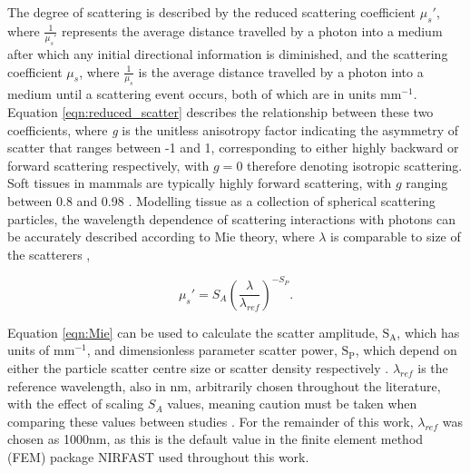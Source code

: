 \documentclass[twoside]{bhamthesis}
\theoremstyle{definition}
\begin{document}
The degree of scattering is described by the reduced scattering coefficient $\mu_s'$, where $\frac{1}{\mu_s'}$ represents the average distance travelled by a photon into a medium after which any initial directional information is diminished, and the scattering coefficient $\mu_s$, where $\frac{1}{\mu_s}$ is the average distance travelled by a photon into a medium until a scattering event occurs, both of which are in units mm$^{-1}$. Equation \ref{eqn:reduced_scatter} describes the relationship between these two coefficients, where \textit{g} is the unitless anisotropy factor indicating the asymmetry of scatter that ranges between -1 and 1, corresponding to either highly backward or forward scattering respectively, with $g=0$ therefore denoting isotropic scattering. Soft tissues in mammals are typically highly forward scattering, with $g$ ranging between 0.8 and 0.98 \cite{cheong1990review}. Modelling tissue as a collection of spherical scattering particles, the wavelength dependence of scattering interactions with photons can be accurately described according to Mie theory, where $\lambda$ is comparable to size of the scatterers  \cite{van1991light,mourant1997predictions},

\begin{equation}
\mu_s' = S_A \left(\frac{\lambda}{\lambda_{ref}}\right)^{-S_P}.
  \label{eqn:Mie}
\end{equation}

Equation \ref{eqn:Mie} can be used to calculate the scatter amplitude, $\mathrm{S_A}$, which has units of $\mathrm{mm^{-1}}$, and dimensionless parameter scatter power, $\mathrm{S_P}$, which depend on either the particle scatter centre size or scatter density respectively \cite{dehghani2009near}. $\lambda_{ref}$ is the reference wavelength, also in nm, arbitrarily chosen throughout the literature, with the effect of scaling $S_A$ values, meaning caution must be taken when comparing these values between studies \cite{jacques2013optical}. For the remainder of this work, $\lambda_{ref}$ was chosen as 1000nm, as this is the default value in the finite element method (FEM) package NIRFAST \cite{dehghani2009near} used throughout this work.

\end{document}
